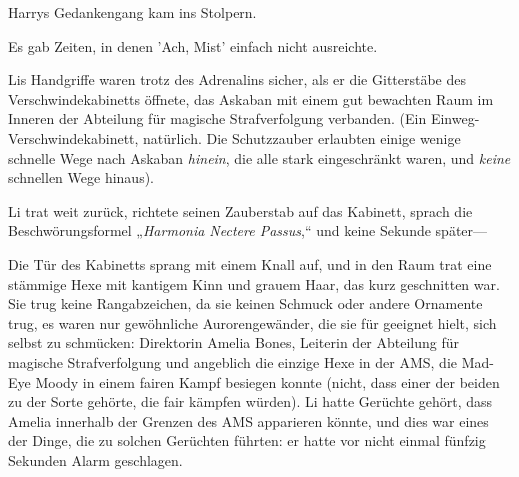 Harrys Gedankengang kam ins Stolpern.

Es gab Zeiten, in denen 'Ach, Mist' einfach nicht ausreichte.

\later

Lis Handgriffe waren trotz des Adrenalins sicher, als er die Gitterstäbe des Verschwindekabinetts öffnete, das Askaban mit einem gut bewachten Raum im Inneren der Abteilung für magische Strafverfolgung verbanden. (Ein Einweg-Verschwindekabinett, natürlich. Die Schutzzauber erlaubten einige wenige schnelle Wege nach Askaban \emph{hinein}, die alle stark eingeschränkt waren, und \emph{keine} schnellen Wege hinaus).

Li trat weit zurück, richtete seinen Zauberstab auf das Kabinett, sprach die Beschwörungsformel „\emph{Harmonia Nectere Passus},“ und keine Sekunde später—

Die Tür des Kabinetts sprang mit einem Knall auf, und in den Raum trat eine stämmige Hexe mit kantigem Kinn und grauem Haar, das kurz geschnitten war. Sie trug keine Rangabzeichen, da sie keinen Schmuck oder andere Ornamente trug, es waren nur gewöhnliche Aurorengewänder, die sie für geeignet hielt, sich selbst zu schmücken: Direktorin Amelia Bones, Leiterin der Abteilung für magische Strafverfolgung und angeblich die einzige Hexe in der AMS, die Mad-Eye Moody in einem fairen Kampf besiegen konnte (nicht, dass einer der beiden zu der Sorte gehörte, die fair kämpfen würden). Li hatte Gerüchte gehört, dass Amelia innerhalb der Grenzen des AMS apparieren könnte, und dies war eines der Dinge, die zu solchen Gerüchten führten: er hatte vor nicht einmal fünfzig Sekunden Alarm geschlagen.

